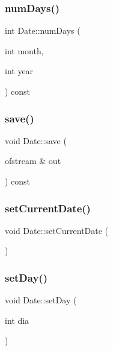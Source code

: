 \hypertarget{class_date_a102f0523e4d84ad9cef682f2ff233808}{}\label{class_date_a102f0523e4d84ad9cef682f2ff233808} 
\subsubsection{\texorpdfstring{num\+Days()}{numDays()}}
{\footnotesize\ttfamily int Date\+::num\+Days (\begin{DoxyParamCaption}\item[{int}]{month,  }\item[{int}]{year }\end{DoxyParamCaption}) const\hspace{0.3cm}{\ttfamily [private]}}

\hypertarget{class_date_af7ea8f12ad1c018f58dbc85f9c844b03}{}\label{class_date_af7ea8f12ad1c018f58dbc85f9c844b03} 
\subsubsection{\texorpdfstring{save()}{save()}}
{\footnotesize\ttfamily void Date\+::save (\begin{DoxyParamCaption}\item[{ofstream \&}]{out }\end{DoxyParamCaption}) const}

\hypertarget{class_date_ada293ae20419963c246a7831096f6091}{}\label{class_date_ada293ae20419963c246a7831096f6091} 
\subsubsection{\texorpdfstring{set\+Current\+Date()}{setCurrentDate()}}
{\footnotesize\ttfamily void Date\+::set\+Current\+Date (\begin{DoxyParamCaption}{ }\end{DoxyParamCaption})}

\hypertarget{class_date_a742b1032af5bbd3e4c9ddfc9c21c1a5a}{}\label{class_date_a742b1032af5bbd3e4c9ddfc9c21c1a5a} 
\subsubsection{\texorpdfstring{set\+Day()}{setDay()}}
{\footnotesize\ttfamily void Date\+::set\+Day (\begin{DoxyParamCaption}\item[{int}]{dia }\end{DoxyParamCaption})}

